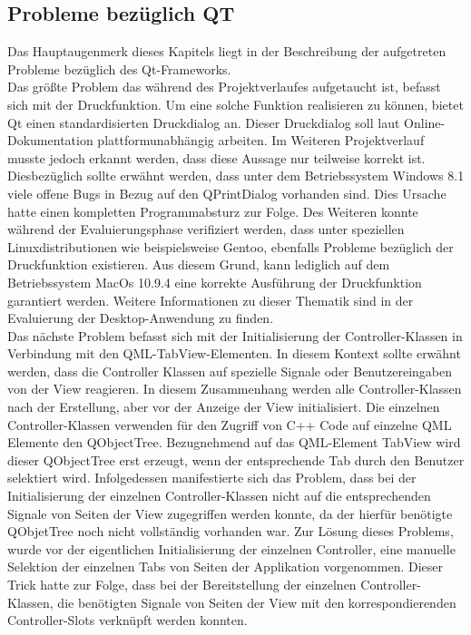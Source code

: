 \subsection{Probleme bezüglich QT} \label{sec:Probleme bezüglich QT}

Das Hauptaugenmerk dieses Kapitels liegt in der Beschreibung der aufgetreten Probleme bezüglich des Qt-Frameworks. \\
Das größte Problem das während des Projektverlaufes aufgetaucht ist, befasst sich mit der Druckfunktion. Um eine solche Funktion realisieren zu können, bietet Qt einen standardisierten Druckdialog an. Dieser Druckdialog soll laut Online-Dokumentation plattformunabhängig arbeiten. Im Weiteren Projektverlauf musste jedoch erkannt werden, dass diese Aussage nur teilweise korrekt ist. Diesbezüglich sollte erwähnt werden, dass unter dem Betriebssystem Windows 8.1 viele offene Bugs in Bezug auf den QPrintDialog vorhanden sind. Dies Ursache hatte einen kompletten Programmabsturz zur Folge. Des Weiteren konnte während der Evaluierungsphase verifiziert werden, dass unter speziellen Linuxdistributionen wie beispielsweise Gentoo, ebenfalls Probleme bezüglich der Druckfunktion existieren. Aus diesem Grund, kann lediglich auf dem Betriebssystem MacOs 10.9.4 eine korrekte Ausführung der Druckfunktion garantiert werden. Weitere Informationen zu dieser Thematik sind in der Evaluierung der Desktop-Anwendung zu finden. \\
Das nächste Problem befasst sich mit der Initialisierung der Controller-Klassen in Verbindung mit den QML-TabView-Elementen. In diesem Kontext sollte erwähnt werden, dass die Controller Klassen auf spezielle Signale oder Benutzereingaben von der View reagieren. In diesem Zusammenhang werden alle Controller-Klassen nach der Erstellung, aber vor der Anzeige der View initialisiert. Die einzelnen Controller-Klassen verwenden für den Zugriff von C++ Code auf einzelne QML Elemente den QObjectTree. Bezugnehmend auf das QML-Element TabView wird dieser QObjectTree erst erzeugt, wenn der entsprechende Tab durch den Benutzer selektiert wird. Infolgedessen manifestierte sich das Problem, dass bei der Initialisierung der einzelnen Controller-Klassen nicht auf die entsprechenden Signale von Seiten der View zugegriffen werden konnte, da der hierfür benötigte QObjetTree noch nicht vollständig vorhanden war. Zur Lösung dieses Problems, wurde vor der eigentlichen Initialisierung der einzelnen Controller, eine manuelle Selektion der einzelnen Tabs von Seiten der Applikation vorgenommen. Dieser Trick hatte zur Folge, dass bei der Bereitstellung der einzelnen Controller-Klassen, die benötigten Signale von Seiten der View mit den korrespondierenden Controller-Slots verknüpft werden konnten.
